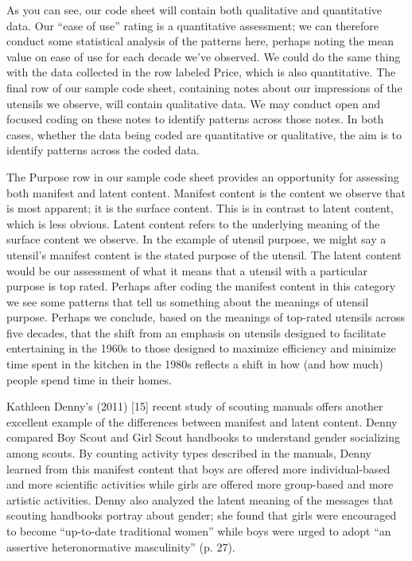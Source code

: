 As you can see, our code sheet will contain both qualitative and quantitative data. Our “ease of use” rating is a quantitative assessment; we can therefore conduct some statistical analysis of the patterns here, perhaps noting the mean value on ease of use for each decade we’ve observed. We could do the same thing with the data collected in the row labeled Price, which is also quantitative. The final row of our sample code sheet, containing notes about our impressions of the utensils we observe, will contain qualitative data. We may conduct open and focused coding on these notes to identify patterns across those notes. In both cases, whether the data being coded are quantitative or qualitative, the aim is to identify patterns across the coded data.

The Purpose row in our sample code sheet provides an opportunity for assessing both manifest and latent content. Manifest content is the content we observe that is most apparent; it is the surface content. This is in contrast to latent content, which is less obvious. Latent content refers to the underlying meaning of the surface content we observe. In the example of utensil purpose, we might say a utensil’s manifest content is the stated purpose of the utensil. The latent content would be our assessment of what it means that a utensil with a particular purpose is top rated. Perhaps after coding the manifest content in this category we see some patterns that tell us something about the meanings of utensil purpose. Perhaps we conclude, based on the meanings of top-rated utensils across five decades, that the shift from an emphasis on utensils designed to facilitate entertaining in the 1960s to those designed to maximize efficiency and minimize time spent in the kitchen in the 1980s reflects a shift in how (and how much) people spend time in their homes.

Kathleen Denny’s (2011) [15] recent study of scouting manuals offers another excellent example of the differences between manifest and latent content. Denny compared Boy Scout and Girl Scout handbooks to understand gender socializing among scouts. By counting activity types described in the manuals, Denny learned from this manifest content that boys are offered more individual-based and more scientific activities while girls are offered more group-based and more artistic activities. Denny also analyzed the latent meaning of the messages that scouting handbooks portray about gender; she found that girls were encouraged to become “up-to-date traditional women” while boys were urged to adopt “an assertive heteronormative masculinity” (p. 27).

